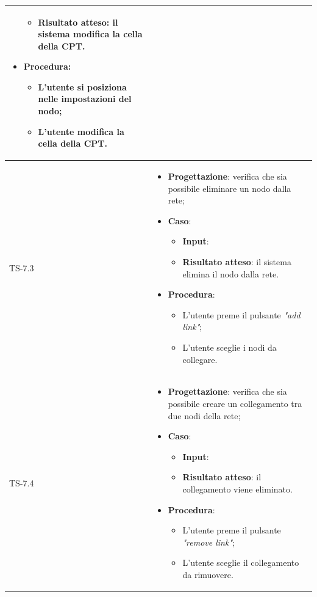 \begin{longtable}{|C{2.5cm}|C{13cm}|}
\begin{itemize}
\begin{itemize}
		\item \textbf{Risultato atteso}: il sistema modifica la cella della CPT.
	\end{itemize}
	\item \textbf{Procedura}:
	\begin{itemize}
		\item L'utente si posiziona nelle impostazioni del nodo;
		\item L'utente modifica la cella della CPT.
	\end{itemize} 
\end{itemize}
	 \\
	\hline
	{TS-7.3} &
\begin{itemize}
	\item \textbf{Progettazione}: verifica che sia possibile eliminare un
	nodo dalla rete;
	\item \textbf{Caso}: 
	\begin{itemize}
		\item \textbf{Input}: 
		\item \textbf{Risultato atteso}: il sistema elimina il nodo dalla rete.
	\end{itemize}
	\item \textbf{Procedura}:
	\begin{itemize}
		\item L'utente preme il pulsante \emph{"add link"};
		\item L'utente sceglie i nodi da collegare.
	\end{itemize} 
\end{itemize}
	  \\
	\hline
	{TS-7.4} & 
\begin{itemize}
	\item \textbf{Progettazione}: verifica che sia possibile creare un
	collegamento tra due nodi della rete;
	\item \textbf{Caso}: 
	\begin{itemize}
		\item \textbf{Input}: 
		\item \textbf{Risultato atteso}: il collegamento viene eliminato.
	\end{itemize}
	\item \textbf{Procedura}:
	\begin{itemize}
		\item L'utente preme il pulsante \emph{"remove link"};
		\item L'utente sceglie il collegamento da rimuovere.
	\end{itemize} 
\end{itemize}\\

\end{longtable}
